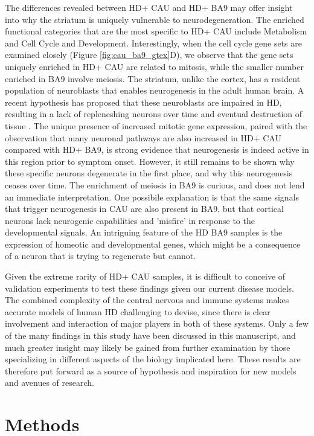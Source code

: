 \documentclass[fleqn,10pt,table]{wlscirep}
\begin{document}
The differences revealed between HD+ CAU and HD+ BA9 may offer insight into why the striatum is uniquely vulnerable to neurodegeneration.
The enriched functional categories that are the most specific to HD+ CAU include Metabolism and Cell Cycle and Development.
Interestingly, when the cell cycle gene sets are examined closely (Figure \ref{fig:cau_ba9_gtex}D), we observe that the gene sets uniquely enriched in HD+ CAU are related to mitosis, while the smaller number enriched in BA9 involve meiosis.
The striatum, unlike the cortex, has a resident population of neuroblasts that enables neurogenesis in the adult human brain\cite{Ernst2014-zw}.
A recent hypothesis has proposed that these neuroblasts are impaired in HD, resulting in a lack of repleneshing neurons over time and eventual destruction of tissue \cite{Kandasamy2018-am}.
The unique presence of increased mitotic gene expression, paired with the observation that many neuronal pathways are also increased in HD+ CAU compared with HD+ BA9, is strong evidence that neurogenesis is indeed active in this region prior to symptom onset.
However, it still remains to be shown why these specific neurons degenerate in the first place, and why this neurogenesis ceases over time.
The enrichment of meiosis in BA9 is curious, and does not lend an immediate interpretation.
One possibile explanation is that the same signals that trigger neurogenesis in CAU are also present in BA9, but that cortical neurons lack neurogenic capabilities and 'misfire' in response to the developmental signals.
An intriguing feature of the HD BA9 samples is the expression of homeotic and developmental genes, which might be a consequence of a neuron that is trying to regenerate but cannot.

Given the extreme rarity of HD+ CAU samples, it is difficult to conceive of validation experiments to test these findings given our current disease models.
The combined complexity of the central nervous and immune systems makes accurate models of human HD challenging to devise, since there is clear involvement and interaction of major players in both of these systems.
Only a few of the many findings in this study have been discussed in this manuscript, and much greater insight may likely be gained from further examination by those specializing in different aspects of the biology implicated here.
These results are therefore put forward as a source of hypothesis and inspiration for new models and avenues of research.

\section{Methods}
\end{document}
